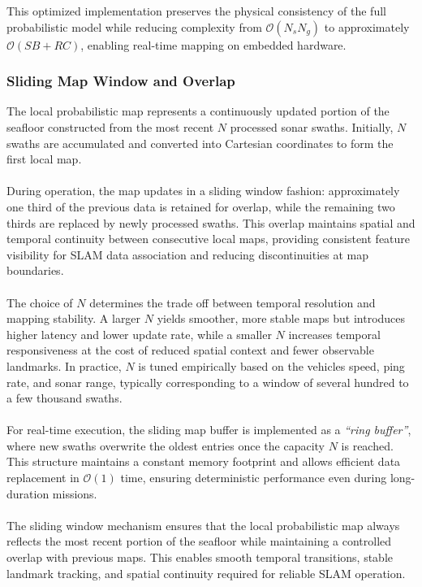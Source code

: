 \noindent
This optimized implementation preserves the physical consistency of the full probabilistic model while reducing complexity from $\mathcal{O}(N_s N_g)$ to approximately $\mathcal{O}(S B + R C)$, enabling real-time mapping on embedded hardware.



\newpage



\subsubsection{Sliding Map Window and Overlap}
The local probabilistic map represents a continuously updated portion of the seafloor constructed from the most recent $N$ processed sonar swaths. Initially, $N$ swaths are accumulated and converted into Cartesian coordinates to form the first local map.  
\\ \\
During operation, the map updates in a sliding window fashion: approximately one third of the previous data is retained for overlap, while the remaining two thirds are replaced by newly processed swaths. This overlap maintains spatial and temporal continuity between consecutive local maps, providing consistent feature visibility for SLAM data association and reducing discontinuities at map boundaries.  
\\ \\
The choice of $N$ determines the trade off between temporal resolution and mapping stability. A larger $N$ yields smoother, more stable maps but introduces higher latency and lower update rate, while a smaller $N$ increases temporal responsiveness at the cost of reduced spatial context and fewer observable landmarks. In practice, $N$ is tuned empirically based on the vehicles speed, ping rate, and sonar range, typically corresponding to a window of several hundred to a few thousand swaths.  
\\ \\
For real-time execution, the sliding map buffer is implemented as a \textit{``ring buffer''}, where new swaths overwrite the oldest entries once the capacity $N$ is reached. This structure maintains a constant memory footprint and allows efficient data replacement in $\mathcal{O}(1)$ time, ensuring deterministic performance even during long-duration missions.  
\\ \\
The sliding window mechanism ensures that the local probabilistic map always reflects the most recent portion of the seafloor while maintaining a controlled overlap with previous maps. This enables smooth temporal transitions, stable landmark tracking, and spatial continuity required for reliable SLAM operation.  
